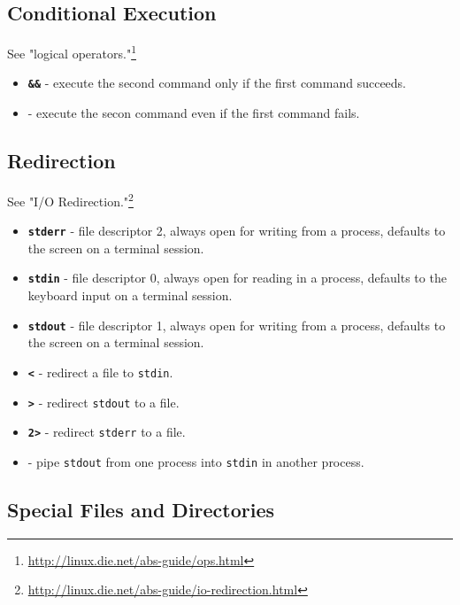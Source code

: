\documentclass[10pt,]{book}
\renewcommand{\href}[2]{#2\footnote{\url{#1}}}
\numberwithin{figure}{chapter}
\begin{document}
\subsection*{Conditional Execution}\label{conditional-execution}

See \href{http://linux.die.net/abs-guide/ops.html}{"logical operators."}

\begin{itemize}
\item
  \textbf{\texttt{\&\&}} - execute the second
  command only if the first command succeeds.
\item
  \textbf{\texttt{\textbar{}\textbar{}}} - execute
  the secon command even if the first command fails.
\end{itemize}

\subsection*{Redirection}\label{redirection}

See \href{http://linux.die.net/abs-guide/io-redirection.html}{"I/O
Redirection."}

\begin{itemize}
\item
  \textbf{\texttt{stderr}} - file descriptor 2, always
  open for writing from a process, defaults to the screen on a terminal
  session.
\item
  \textbf{\texttt{stdin}} - file descriptor 0, always open
  for reading in a process, defaults to the keyboard input on a terminal
  session.
\item
  \textbf{\texttt{stdout}} - file descriptor 1, always
  open for writing from a process, defaults to the screen on a terminal
  session.
\item
  \textbf{\texttt{\textless{}}} - redirect a file to \texttt{stdin}.
\item
  \textbf{\texttt{\textgreater{}}} - redirect \texttt{stdout} to a file.
\item
  \textbf{\texttt{2\textgreater{}}} - redirect \texttt{stderr} to a
  file.
\item
  \textbf{\texttt{\textbar{}}} - pipe \texttt{stdout} from one process
  into \texttt{stdin} in another process.
\end{itemize}

\subsection*{Special Files and
Directories}\label{special-files-and-directories}
\end{document}
